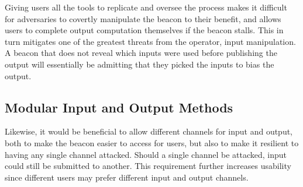Giving users all the tools to replicate and oversee the process makes it difficult for adversaries to covertly manipulate the beacon to their benefit, and allows users to complete output computation themselves if the beacon stalls.
This in turn mitigates one of the greatest threats from the operator, input manipulation.
A beacon that does not reveal which inputs were used before publishing the output will essentially be admitting that they picked the inputs to bias the output.

\subsection{Modular Input and Output Methods}
Likewise, it would be beneficial to allow different channels for input and output, both to make the beacon easier to access for users, but also to make it resilient to having any single channel attacked.
Should a single channel be attacked, input could still be submitted to another.
This requirement further increases usability since different users may prefer different input and output channels.



